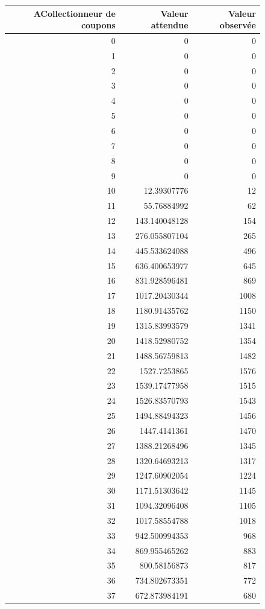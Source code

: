 \documentclass[10pt,a4paper]{article}
\begin{document}
\begin{figure}[h]
		\centering
\begin{tabular}{|r|r|r|}
\hline
ACollectionneur de coupons & Valeur attendue & Valeur observée\\
\hline
0 & 0 & 0\\
1 & 0 & 0\\
2 & 0 & 0\\
3 & 0 & 0\\
4 & 0 & 0\\
5 & 0 & 0\\
6 & 0 & 0\\
7 & 0 & 0\\
8 & 0 & 0\\
9 & 0 & 0\\
10 & 12.39307776 & 12\\
11 & 55.76884992 & 62\\
12 & 143.140048128 & 154\\
13 & 276.055807104 & 265\\
14 & 445.533624088 & 496\\
15 & 636.400653977 & 645\\
16 & 831.928596481 & 869\\
17 & 1017.20430344 & 1008\\
18 & 1180.91435762 & 1150\\
19 & 1315.83993579 & 1341\\
20 & 1418.52980752 & 1354\\
21 & 1488.56759813 & 1482\\
22 & 1527.7253865 & 1576\\
23 & 1539.17477958 & 1515\\
24 & 1526.83570793 & 1543\\
25 & 1494.88494323 & 1456\\
26 & 1447.4141361 & 1470\\
27 & 1388.21268496 & 1345\\
28 & 1320.64693213 & 1317\\
29 & 1247.60902054 & 1224\\
30 & 1171.51303642 & 1145\\
31 & 1094.32096408 & 1105\\
32 & 1017.58554788 & 1018\\
33 & 942.500994353 & 968\\
34 & 869.955465262 & 883\\
35 & 800.58156873 & 817\\
36 & 734.802673351 & 772\\
37 & 672.873984191 & 680\\

\end{tabular}
\end{figure}
\end{document}
